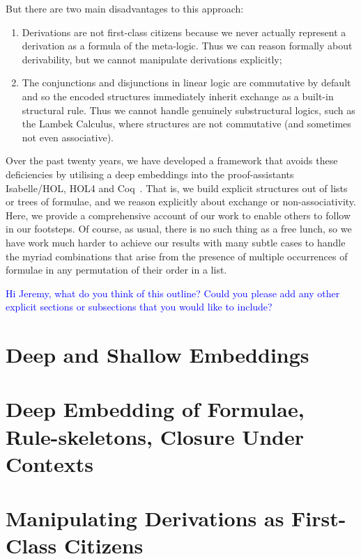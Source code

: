 \documentclass[a4paper]{article}
\newcommand{\raj}[1]{\textcolor{blue}{#1}}
\begin{document}
But there are two main disadvantages to this approach:
\begin{enumerate}
\item Derivations are not first-class citizens because we never actually represent a derivation as a formula of the meta-logic.
  Thus we can reason formally about derivability, but we cannot manipulate derivations explicitly;
\item The conjunctions and disjunctions in linear logic are commutative by default and so the encoded structures immediately
  inherit exchange as a built-in structural rule. Thus we cannot handle genuinely substructural logics,
  such as the Lambek Calculus, where
  structures are not commutative (and sometimes not even associative).
\end{enumerate}

Over the past twenty years, we have developed a framework that avoids these deficiencies by utilising a deep embeddings into the
proof-assistants Isabelle/HOL, HOL4 and Coq~\cite{dawson-gore-generalised,dawson-gore-dual-tableaux,dawson-gore-display}.  That
is, we build explicit structures out of lists or trees of formulae, and we reason explicitly about exchange or
non-associativity. Here, we provide a comprehensive account of our work to enable others to follow in our footsteps.  Of course,
as usual, there is no such thing as a free lunch, so we have work much harder to achieve our results with many subtle cases to
handle the myriad combinations that arise from the presence of multiple occurrences of formulae in any permutation of their order
in a list.

\raj{Hi Jeremy, what do you think of this outline? Could you please add any other explicit sections or subsections that you would like to include?}

\section{Deep and Shallow Embeddings}

\section{Deep Embedding of Formulae, Rule-skeletons, Closure Under Contexts}

\section{Manipulating Derivations as First-Class Citizens}
\end{document}

